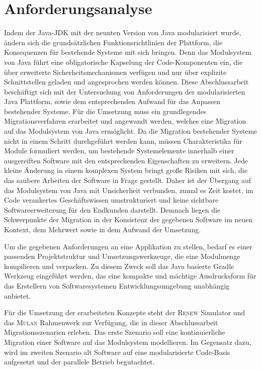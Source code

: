 \section{Anforderungsanalyse} 
	Indem der Java-JDK mit der neunten Version von Java modularisiert wurde, ändern sich die grundsätzlichen Funktionsrichtlinien der Plattform, die Konsequenzen für bestehende Systeme mit sich bringen. Denn das Modulsystem von Java führt eine obligatorische Kapselung der Code-Komponenten ein, die über erweiterte Sicherheitsmechanismen verfügen und nur über explizite Schnittstellen geladen und angesprochen werden können.\newline 
	Diese Abschlussarbeit beschäftigt sich mit der Untersuchung von Anforderungen der modularisierten Java Plattform, sowie dem entsprechenden Aufwand für das Anpassen bestehender Systeme. \newline
	Für die Umsetzung muss ein grundlegendes Migrationsverfahren erarbeitet und angewandt werden, welches eine Migration auf das Modulsystem von Java ermöglicht. Da die Migration bestehender Systeme nicht in einem Schritt durchgeführt werden kann, müssen Charakteristika für Module formuliert werden, um bestehende Systemelemente innerhalb einer ausgereiften Software mit den entsprechenden Eigenschaften zu erweitern.\newline
	Jede kleine Änderung in einem komplexen System bringt große Risiken mit sich, die das saubere Arbeiten der Software in Frage gestellt. Daher ist der Übergang auf das Modulsystem von Java mit Unsicherheit verbunden, zumal es Zeit kostet, im Code verankertes Geschäftswissen umstrukturiert und keine sichtbare Softwareerweiterung für den Endkunden darstellt. Demnach liegen die Schwerpunkte der Migration in der Konsistenz der gegebenen Software im neuen Kontext, dem Mehrwert sowie in dem Aufwand der Umsetzung. \bigbreak

	Um die gegebenen Anforderungen an eine Applikation zu stellen, bedarf es einer passenden Projektstruktur und Umsetzungswerkzeuge, die eine Modulmenge kompilieren und verpacken. Zu diesem Zweck soll das Java basierte Gradle Werkzeug eingeführt werden, das eine kompakte und mächtige Ausdrucksform für das Erstellern von Softwaresystemen Entwicklungsumgebung unabhängig anbietet. \bigbreak

	Für die Umsetzung der erarbeiteten Konzepte steht der \textsc{Renew} Simulator und das \textsc{Mulan} Rahmenwerk zur Verfügung, die in dieser Abschlussarbeit Migrationsszenarien erleben.\newline 
	Das erste Szenario soll eine kontinuierliche Migration einer Software auf das Modulsystem modellieren. Im Gegensatz dazu, wird im zweiten Szenario alt Software auf eine modularisierte Code-Basis aufgesetzt und der parallele Betrieb begutachtet.  

